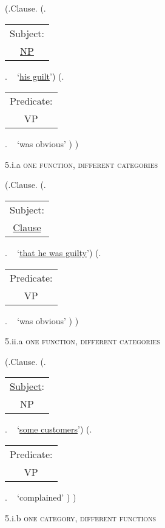\documentclass[12pt,letterpaper]{article}
\begin{document}
	\begin{figure}
	\begin{center}
		\begin{parsetree}
			(.Clause.
			(.\begin{tabular}{c}Subject:\\\underline{NP}\end{tabular}.  ~ `\underline{his guilt}')
			(.\begin{tabular}{c}Predicate:\\VP\end{tabular}. ~  `was obvious' )
			)
			
			\hfill \break\hfill \break
		\end{parsetree}
		5.i.a \textsc{one function, different categories}
	\end{center}
\end{figure}
	\begin{figure}
	\begin{center}
		\begin{parsetree}
			(.Clause.
			(.\begin{tabular}{c}Subject:\\\underline{Clause}\end{tabular}.  ~ `\underline{that he was guilty}')
			(.\begin{tabular}{c}Predicate:\\VP\end{tabular}. ~  `was obvious' )
			)
			
			\hfill \break\hfill \break
		\end{parsetree}
		5.ii.a \textsc{one function, different categories}
	\end{center}
\end{figure}

	\begin{figure}
	\begin{center}
		\begin{parsetree}
			(.Clause.
			(.\begin{tabular}{c}\underline{Subject}:\\NP\end{tabular}.  ~ `\underline{some customers}')
			(.\begin{tabular}{c}Predicate:\\VP\end{tabular}. ~  `complained' )
			)
			
			\hfill \break\hfill \break
		\end{parsetree}
		5.i.b \textsc{one category, different functions}
	\end{center}
\end{figure}
\end{document}
